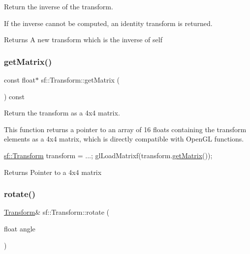 Return the inverse of the transform. 

If the inverse cannot be computed, an identity transform is returned.

\begin{DoxyReturn}{Returns}
A new transform which is the inverse of self 
\end{DoxyReturn}
\mbox{\label{classsf_1_1_transform_ad52616cac686f47bd26bcbdd8e2add40}} 
\subsubsection{\texorpdfstring{get\+Matrix()}{getMatrix()}}
{\footnotesize\ttfamily const float$\ast$ sf\+::\+Transform\+::get\+Matrix (\begin{DoxyParamCaption}{ }\end{DoxyParamCaption}) const}



Return the transform as a 4x4 matrix. 

This function returns a pointer to an array of 16 floats containing the transform elements as a 4x4 matrix, which is directly compatible with Open\+GL functions.


\begin{DoxyCode}
\hyperlink{classsf_1_1_transform}{sf::Transform} transform = ...;
glLoadMatrixf(transform.\hyperlink{classsf_1_1_transform_ad52616cac686f47bd26bcbdd8e2add40}{getMatrix}());
\end{DoxyCode}


\begin{DoxyReturn}{Returns}
Pointer to a 4x4 matrix 
\end{DoxyReturn}
\mbox{\label{classsf_1_1_transform_a3e548c3c9e3fb9d4bd43cf852669e555}} 
\subsubsection{\texorpdfstring{rotate()}{rotate()}\hspace{0.1cm}{\footnotesize\ttfamily [1/3]}}
{\footnotesize\ttfamily \hyperlink{classsf_1_1_transform}{Transform}\& sf\+::\+Transform\+::rotate (\begin{DoxyParamCaption}\item[{float}]{angle }\end{DoxyParamCaption})}



